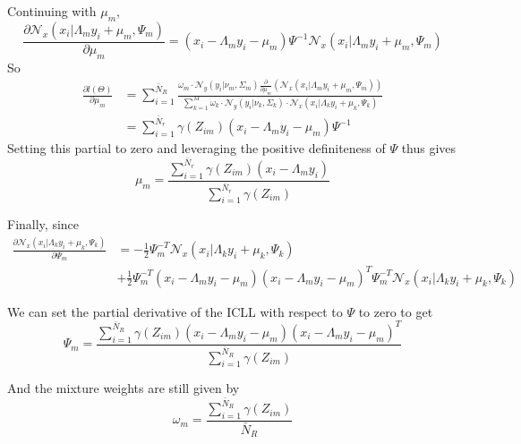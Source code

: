 Continuing with $\mu_m$, 
\begin{equation}
\frac{\partial\mathcal{N}_x\left(x_i\vert\Lambda_my_i + \mu_m,\Psi_m\right)}{\partial \mu_m} = \left(x_i - \Lambda_my_i - \mu_m\right)\Psi^{-1}\mathcal{N}_x\left(x_i\vert\Lambda_my_i + \mu_m,\Psi_m\right)
\end{equation}
So
\begin{align}
\frac{\partial l(\Theta)}{\partial \mu_m} &= \sum\limits_{i = 1}^{\bar{N}_R}
\frac{\omega_m\cdot
\mathcal{N}_y\left(y_i\vert\nu_m,\Sigma_m\right)\frac{\partial }{\partial \mu_m}\left(\mathcal{N}_x\left(x_i\vert\Lambda_my_i + \mu_m,\Psi_m\right)\right)}{\sum\limits_{k = 1}^{M}\omega_k\cdot
\mathcal{N}_y\left(y_i\vert\nu_k,\Sigma_k\right)\cdot\mathcal{N}_x\left(x_i\vert\Lambda_ky_i + \mu_k,\Psi_k\right) }\\
&= \sum\limits_{i = 1}^{\bar{N}_r}\gamma(Z_{im})\left(x_i - \Lambda_my_i - \mu_m\right)\Psi^{-1}
\end{align}
Setting this partial to zero and leveraging the positive definiteness of $\Psi$ thus gives
\begin{equation}
\boxed{\mu_m = \frac{\sum\limits_{i = 1}^{\bar{N}_r}\gamma(Z_{im})\left(x_i - \Lambda_my_i\right)}{\sum\limits_{i = 1}^{\bar{N}_r}\gamma(Z_{im})} }
\end{equation}

Finally, since
\begin{align}
\frac{\partial\mathcal{N}_x\left(x_i\vert\Lambda_ky_i + \mu_k,\Psi_k\right)}{\partial \Psi_m} &= -\frac{1}{2}\Psi_m^{-T}\mathcal{N}_x\left(x_i\vert\Lambda_ky_i + \mu_k,\Psi_k\right) \nonumber\\
&+ \frac{1}{2}
\Psi_m^{-T}\left(x_i -\Lambda_my_i - \mu_m\right)\left(x_i -\Lambda_my_i - \mu_m\right)^T\Psi_m^{-T}\mathcal{N}_x\left(x_i\vert\Lambda_ky_i + \mu_k,\Psi_k\right)
\end{align}

We can set the partial derivative of the ICLL with respect to $\Psi$ to zero to get
\begin{equation}
\boxed{
\Psi_m = \frac{  \sum\limits_{i = 1}^{\bar{N}_R} \gamma(Z_{im})\left(x_i -\Lambda_my_i - \mu_m\right)\left(x_i -\Lambda_my_i - \mu_m\right)^T }{  \sum\limits_{i = 1}^{\bar{N}_R}\gamma(Z_{im})}}
\end{equation}

And the mixture weights are still given by
\begin{equation}
\boxed{
\omega_m = \frac{\sum\limits_{i = 1}^{\bar{N}_R}\gamma(Z_{im})}{\bar{N}_R}}
\end{equation}






